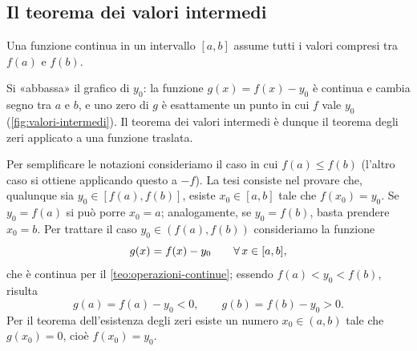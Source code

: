 \subsection{Il teorema dei valori intermedi}

\begin{teorema}\label{teo:valori-intermedi-1}
Una funzione continua in un intervallo $[a,b]$ assume tutti i valori compresi tra $f(a)$
e $f(b)$.
\end{teorema}

\begin{schema}
\end{schema}

\begin{strategia}
Si «abbassa» il grafico di $y_{0}$: la funzione $g(x)=f(x)-y_{0}$ è continua e cambia
segno tra $a$ e $b$, e uno zero di $g$ è esattamente un punto in cui $f$ vale $y_{0}$
(\cref{fig:valori-intermedi}). Il teorema dei valori intermedi è dunque il teorema degli
zeri applicato a una funzione traslata.
\end{strategia}

\begin{dimostrazione}
Per semplificare le notazioni consideriamo il caso in cui $f(a)\le f(b)$ (l'altro caso
si ottiene applicando questo a $-f$). La tesi consiste nel provare che, qualunque sia
$y_{0}\in[f(a),f(b)]$, esiste $x_{0}\in[a,b]$ tale che $f(x_{0})=y_{0}$. Se $y_{0}=f(a)$ si
può porre $x_{0}=a$; analogamente, se $y_{0}=f(b)$, basta prendere $x_{0}=b$. Per trattare
il caso $y_{0}\in(f(a),f(b))$ consideriamo la funzione
\begin{equation}\label{eq:vi-g}
  g(x)=f(x)-y_{0} \qquad\forall\, x\in[a,b],
\end{equation}
che è continua per il \cref{teo:operazioni-continue}; essendo $f(a)<y_{0}<f(b)$, risulta
\begin{equation}\label{eq:vi-segni}
  g(a)=f(a)-y_{0}<0, \qquad g(b)=f(b)-y_{0}>0 .
\end{equation}
Per il teorema dell'esistenza degli zeri esiste un numero $x_{0}\in(a,b)$ tale che
$g(x_{0})=0$, cioè $f(x_{0})=y_{0}$.
\end{dimostrazione}

